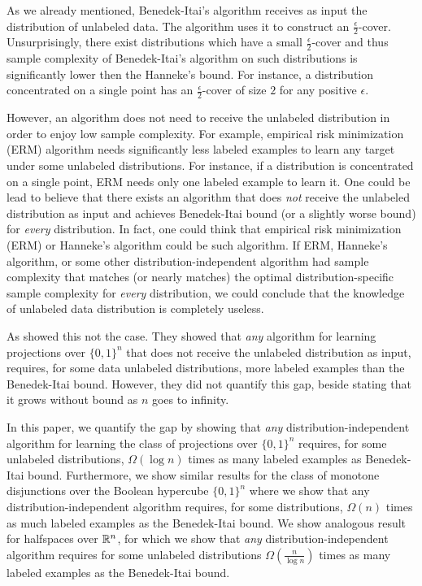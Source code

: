 As we already mentioned, Benedek-Itai's algorithm receives as input the
distribution of unlabeled data. The algorithm uses it to construct an
$\frac{\epsilon}{2}$-cover. Unsurprisingly, there exist distributions which have
a small $\frac{\epsilon}{2}$-cover and thus sample complexity of Benedek-Itai's
algorithm on such distributions is significantly lower then the Hanneke's bound.
For instance, a distribution concentrated on a single point has an
$\frac{\epsilon}{2}$-cover of size $2$ for any positive $\epsilon$.

However, an algorithm does not need to receive the unlabeled distribution in
order to enjoy low sample complexity. For example, empirical risk minimization
(ERM) algorithm needs significantly less labeled examples to learn any target
under some unlabeled distributions. For instance, if a distribution is
concentrated on a single point, ERM needs only one labeled example to learn it.
One could be lead to believe that there exists an algorithm that does \emph{not}
receive the unlabeled distribution as input and achieves Benedek-Itai bound (or
a slightly worse bound) for \emph{every} distribution. In fact, one could think
that empirical risk minimization (ERM) or Hanneke's algorithm could be such
algorithm. If ERM, Hanneke's algorithm, or some other distribution-independent
algorithm had sample complexity that matches (or nearly matches) the optimal
distribution-specific sample complexity for \emph{every} distribution, we could
conclude that the knowledge of unlabeled data distribution is completely
useless.

As \cite{Darnstadt-Simon-Szorenyi-2013} showed this not the case. They showed
that \emph{any} algorithm for learning projections over $\{0,1\}^n$ that does
not receive the unlabeled distribution as input, requires, for some data
unlabeled distributions, more labeled examples than the Benedek-Itai bound.
However, they did not quantify this gap, beside stating that it grows without
bound as $n$ goes to infinity.

In this paper, we quantify the gap by showing that \emph{any}
distribution-independent algorithm for learning the class of projections over
$\{0,1\}^n$ requires, for some unlabeled distributions, $\Omega(\log n)$ times
as many labeled examples as Benedek-Itai bound. Furthermore, we show similar
results for the class of monotone disjunctions over the Boolean hypercube
$\{0,1\}^n$ where we show that any distribution-independent algorithm requires,
for some distributions, $\Omega(n)$ times as much labeled examples as the
Benedek-Itai bound. We show analogous result for halfspaces over $\mathbb{R}^n$, for
which we show that \emph{any} distribution-independent algorithm requires for
some unlabeled distributions $\Omega(\frac{n}{\log n})$ times as many labeled
examples as the Benedek-Itai bound.

